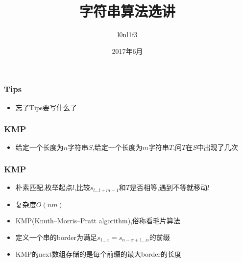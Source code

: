 \documentclass[notheorems]{beamer}
\begin{document}
\title[字符串算法选讲]{字符串算法选讲}
\author[l0nl1f3]{l0nl1f3}
\date[June, 2017]{2017年6月}
\frame{\titlepage}

\begin{frame}
\frametitle{Tips}
\begin{itemize}[]  
\item 忘了Tips要写什么了
\end{itemize}
\end{frame}

\begin{frame}
\frametitle{KMP}
\begin{itemize}[]
\item 给定一个长度为$n$字符串$S$,给定一个长度为$m$字符串$T$,问$T$在$S$中出现了几次 
\end{itemize}
\end{frame}

\begin{frame}
\frametitle{KMP}
\begin{itemize}[]
\item 朴素匹配,枚举起点$l$,比较$s_{l\ldots l+m-1}$和$T$是否相等,遇到不等就移动$l$
\item 复杂度$O(nm)$
\pause
\item KMP(Knuth–Morris–Pratt algorithm),俗称看毛片算法
\pause
\item 定义一个串的border为满足$s_{1\ldots x} = s_{n-x+1\ldots n}$的前缀
\pause
\item KMP的next数组存储的是每个前缀的最大border的长度
\end{itemize}
\end{frame}
\end{document}
